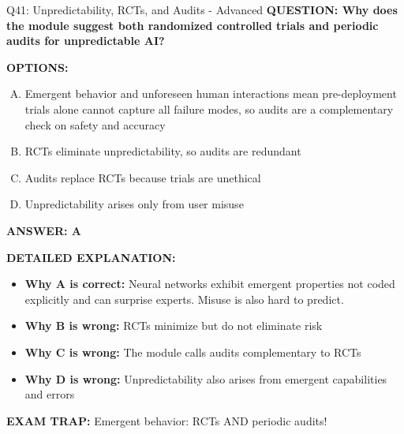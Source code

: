 \documentclass[8pt]{beamer}
\begin{document}
\begin{frame}[shrink=6]{Q41: Unpredictability, RCTs, and Audits - Advanced}
\fontsize{6.5}{7.5}\selectfont
\textbf{QUESTION: Why does the module suggest both randomized controlled trials and periodic audits for unpredictable AI?}

\vspace{0.1cm}
\textbf{OPTIONS:}
\begin{enumerate}[A.]
\item Emergent behavior and unforeseen human interactions mean pre-deployment trials alone cannot capture all failure modes, so audits are a complementary check on safety and accuracy
\item RCTs eliminate unpredictability, so audits are redundant
\item Audits replace RCTs because trials are unethical
\item Unpredictability arises only from user misuse
\end{enumerate}

\vspace{0.1cm}
\textcolor{myblue}{\textbf{ANSWER: A}}

\vspace{0.1cm}
\textbf{DETAILED EXPLANATION:}
\begin{itemize}
\item \textbf{Why A is correct:} Neural networks exhibit emergent properties not coded explicitly and can surprise experts. Misuse is also hard to predict.
\item \textbf{Why B is wrong:} RCTs minimize but do not eliminate risk
\item \textbf{Why C is wrong:} The module calls audits complementary to RCTs
\item \textbf{Why D is wrong:} Unpredictability also arises from emergent capabilities and errors
\end{itemize}

\textcolor{myred}{\textbf{EXAM TRAP:}} Emergent behavior: RCTs AND periodic audits!
\end{frame}
\end{document}
